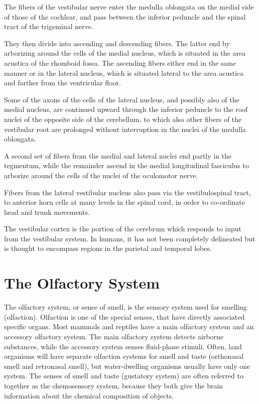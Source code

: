 \documentclass[]{book}
\begin{document}
The fibers of the vestibular nerve enter the medulla oblongata on the medial side of those of the cochlear, and pass between the inferior peduncle and the spinal tract of the trigeminal nerve.

They then divide into ascending and descending fibers. The latter end by arborizing around the cells of the medial nucleus, which is situated in the area acustica of the rhomboid fossa. The ascending fibers either end in the same manner or in the lateral nucleus, which is situated lateral to the area acustica and farther from the ventricular floor.

Some of the axons of the cells of the lateral nucleus, and possibly also of the medial nucleus, are continued upward through the inferior peduncle to the roof nuclei of the opposite side of the cerebellum, to which also other fibers of the vestibular root are prolonged without interruption in the nuclei of the medulla oblongata.

A second set of fibers from the medial and lateral nuclei end partly in the tegmentum, while the remainder ascend in the medial longitudinal fasciculus to arborize around the cells of the nuclei of the oculomotor nerve.

Fibers from the lateral vestibular nucleus also pass via the vestibulospinal tract, to anterior horn cells at many levels in the spinal cord, in order to co-ordinate head and trunk movements.

The vestibular cortex is the portion of the cerebrum which responds to input from the vestibular system. In humans, it has not been completely delineated but is thought to encompass regions in the parietal and temporal lobes.

\hypertarget{the-olfactory-system}{%
\chapter{The Olfactory System}\label{the-olfactory-system}}

The olfactory system, or sense of smell, is the sensory system used for smelling (olfaction). Olfaction is one of the special senses, that have directly associated specific organs. Most mammals and reptiles have a main olfactory system and an accessory olfactory system. The main olfactory system detects airborne substances, while the accessory system senses fluid-phase stimuli. Often, land organisms will have separate olfaction systems for smell and taste (orthonasal smell and retronasal smell), but water-dwelling organisms usually have only one system. The senses of smell and taste (gustatory system) are often referred to together as the chemosensory system, because they both give the brain information about the chemical composition of objects.
\end{document}
